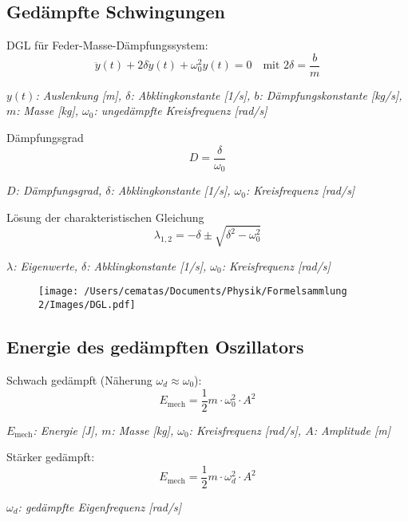 \documentclass[a5paper,10pt]{article}
\newenvironment{displayformula}
{
	\begin{framed}
		\color{formulaColor}
	}
	{\end{framed}}
\newcommand{\formulalegend}[1]{%
	\par\vspace{0.5ex}%
	{{\color{legendColor}\RaggedRight\small\textit{#1}}}%
	\par\vspace{1.5ex}%
}
\begin{document}
\subsection{Gedämpfte Schwingungen}

\begin{displayformula}
	DGL für Feder-Masse-Dämpfungssystem:
	\[
	\ddot{y}(t) + 2\delta \dot{y}(t) + \omega_0^2 y(t) = 0
	\quad \text{mit } 2\delta = \frac{b}{m}
	\]
\end{displayformula}
\formulalegend{
	\( y(t) \): Auslenkung [m], \( \delta \): Abklingkonstante [1/s], \( b \): Dämpfungskonstante [kg/s], \( m \): Masse [kg], \( \omega_0 \): ungedämpfte Kreisfrequenz [rad/s]
}

\begin{displayformula}
	Dämpfungsgrad
	\[
	D = \frac{\delta}{\omega_0}
	\]
\end{displayformula}
\formulalegend{
	\( D \): Dämpfungsgrad, \( \delta \): Abklingkonstante [1/s], \( \omega_0 \): Kreisfrequenz [rad/s]
}

\begin{displayformula}
	Lösung der charakteristischen Gleichung
	\[
	\lambda_{1,2} = -\delta \pm \sqrt{\delta^2 - \omega_0^2}
	\]
\end{displayformula}
\formulalegend{
	\( \lambda \): Eigenwerte, \( \delta \): Abklingkonstante [1/s], \( \omega_0 \): Kreisfrequenz [rad/s]
}
\newpage
\begin{figure}[h]
	\centering
	\texttt{[image: /Users/cematas/Documents/Physik/Formelsammlung 2/Images/DGL.pdf]}
\end{figure}
\newpage
\subsection{Energie des gedämpften Oszillators}

\begin{displayformula}
	Schwach gedämpft (Näherung \( \omega_d \approx \omega_0 \)):
	\[
	E_{\text{mech}} = \frac{1}{2} m \cdot \omega_0^2 \cdot A^2
	\]
\end{displayformula}
\formulalegend{
	\( E_{\text{mech}} \): Energie [J], \( m \): Masse [kg], \( \omega_0 \): Kreisfrequenz [rad/s], \( A \): Amplitude [m]
}

\begin{displayformula}
	Stärker gedämpft:
	\[
	E_{\text{mech}} = \frac{1}{2} m \cdot \omega_d^2 \cdot A^2
	\]
\end{displayformula}
\formulalegend{
	\( \omega_d \): gedämpfte Eigenfrequenz [rad/s]
}
\end{document}
